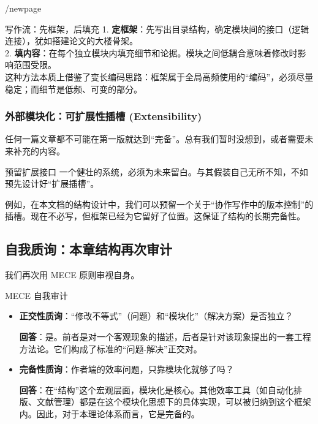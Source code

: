 \documentclass[11pt, a4paper]{ctexart}
\begin{document}
	/newpage
	
	\begin{strategybox}{写作流：先框架，后填充}
		1. \textbf{定框架}：先写出目录结构，确定模块间的接口（逻辑连接），犹如搭建论文的大楼骨架。\\
		2. \textbf{填内容}：在每个独立模块内填充细节和论据。模块之间低耦合意味着修改时影响范围受限。\\
		这种方法本质上借鉴了变长编码思路：框架属于全局高频使用的“编码”，必须尽量稳定；而细节是低频、可变的部分。
	\end{strategybox}
	
	\subsubsection{外部模块化：可扩展性插槽 (Extensibility)}
	
	任何一篇文章都不可能在第一版就达到“完备”。总有我们暂时没想到，或者需要未来补充的内容。
	
	\begin{strategybox}{预留扩展接口}
		一个健壮的系统，必须为未来留白。与其假装自己无所不知，不如预先设计好“扩展插槽”。
		
		例如，在本文档的结构设计中，我们可以预留一个关于“协作写作中的版本控制”的插槽。现在不必写，但框架已经为它留好了位置。这保证了结构的长期完备性。
	\end{strategybox}
	
	
	
	\subsection{自我质询：本章结构再次审计}
	我们再次用 MECE 原则审视自身。
	
	\begin{strategybox}{MECE 自我审计}
		\begin{itemize}
			\item \textbf{正交性质询}：“修改不等式”（问题）和“模块化”（解决方案）是否独立？
			
			\textbf{回答}：是。前者是对一个客观现象的描述，后者是针对该现象提出的一套工程方法论。它们构成了标准的“问题-解决”正交对。
			
			\item \textbf{完备性质询}：作者端的效率问题，只靠模块化就够了吗？
			
			\textbf{回答}：在“结构”这个宏观层面，模块化是核心。其他效率工具（如自动化排版、文献管理）都是在这个模块化思想下的具体实现，可以被归纳到这个框架内。因此，对于本理论体系而言，它是完备的。
		\end{itemize}
	\end{strategybox}
	
\end{document}
